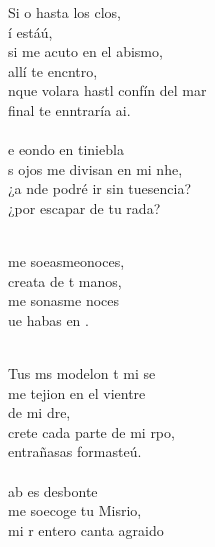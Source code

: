 \begin{cancion}
	Si o hasta los clos,\\
	í estáú, \\
	si me acuto en el abismo, \\
	allí te encntro, \\
	nque volara hastl confín del mar\\
	final te enntraría ai. \\
\jump\\
	e eondo en tiniebla \\
	s ojos me divisan en mi nhe, \\
	¿a nde podré ir sin tuesencia?  \\
	¿por escapar de tu rada?  \\\jump\\
	\begin{chorus}%
	 me soeasmeonoces, \\
	 creata de t manos, \\
	 me sonasme noces \\
	ue habas en . \\
	\end{chorus}%
	\jump\\
	Tus ms modelon t mi se\\
	me tejion en el vientre\\
	de mi dre, \\
	crete cada parte de mi rpo, \\
	 entrañasas formasteú. \\
\jump\\
	ab es desbonte \\
	me soecoge tu Misrio, \\
	mi r entero canta agraido \\

\end{cancion}
